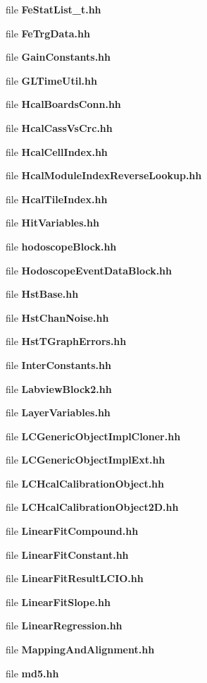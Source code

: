 \begin{DoxyCompactItemize}
file {\bfseries Fe\-Stat\-List\-\_\-t.\-hh}
\item 
file {\bfseries Fe\-Trg\-Data.\-hh}
\item 
file {\bfseries Gain\-Constants.\-hh}
\item 
file {\bfseries G\-L\-Time\-Util.\-hh}
\item 
file {\bfseries Hcal\-Boards\-Conn.\-hh}
\item 
file {\bfseries Hcal\-Cass\-Vs\-Crc.\-hh}
\item 
file {\bfseries Hcal\-Cell\-Index.\-hh}
\item 
file {\bfseries Hcal\-Module\-Index\-Reverse\-Lookup.\-hh}
\item 
file {\bfseries Hcal\-Tile\-Index.\-hh}
\item 
file {\bfseries Hit\-Variables.\-hh}
\item 
file {\bfseries hodoscope\-Block.\-hh}
\item 
file {\bfseries Hodoscope\-Event\-Data\-Block.\-hh}
\item 
file {\bfseries Hst\-Base.\-hh}
\item 
file {\bfseries Hst\-Chan\-Noise.\-hh}
\item 
file {\bfseries Hst\-T\-Graph\-Errors.\-hh}
\item 
file {\bfseries Inter\-Constants.\-hh}
\item 
file {\bfseries Labview\-Block2.\-hh}
\item 
file {\bfseries Layer\-Variables.\-hh}
\item 
file {\bfseries L\-C\-Generic\-Object\-Impl\-Cloner.\-hh}
\item 
file {\bfseries L\-C\-Generic\-Object\-Impl\-Ext.\-hh}
\item 
file {\bfseries L\-C\-Hcal\-Calibration\-Object.\-hh}
\item 
file {\bfseries L\-C\-Hcal\-Calibration\-Object2\-D.\-hh}
\item 
file {\bfseries Linear\-Fit\-Compound.\-hh}
\item 
file {\bfseries Linear\-Fit\-Constant.\-hh}
\item 
file {\bfseries Linear\-Fit\-Result\-L\-C\-I\-O.\-hh}
\item 
file {\bfseries Linear\-Fit\-Slope.\-hh}
\item 
file {\bfseries Linear\-Regression.\-hh}
\item 
file {\bfseries Mapping\-And\-Alignment.\-hh}
\item 
file {\bfseries md5.\-hh}
\item 

\end{DoxyCompactItemize}
